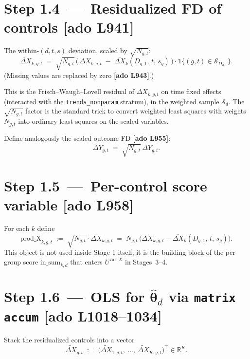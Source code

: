 \documentclass[11pt]{article}
\newcommand{\Adoref}[1]{\textcolor{accent}{\footnotesize\textbf{[ado L#1]}}}
\newcommand{\R}{\mathbb{R}}
\newcommand{\1}{\mathbb{1}}
\newcommand{\Smpl}{\mathcal{S}}
\newcommand{\thetad}{\widehat{\bm{\theta}}_d}
\newcommand{\Ngt}{N_{g,t}}
\newcommand{\dY}{\Delta Y_{g,t}}
\newcommand{\dXk}{\Delta X_{k,g,t}}
\newcommand{\dXbar}{\overline{\Delta X}}
\begin{document}
\section[Step 1.4 -- Residualized FD of controls (L941)]{Step 1.4 \,---\, Residualized FD of controls \Adoref{941}}

The within-$(d,t,s)$ deviation, scaled by $\sqrt{\Ngt}$:
\begin{equation}
\widetilde{\Delta X}_{k,g,t}
\;=\;
\sqrt{\Ngt}\,\bigl(\,\dXk \;-\; \dXbar_k(D_{g,1},\,t,\,s_g)\,\bigr)\cdot \1\{(g,t)\in\Smpl_{D_{g,1}}\}.
\label{eq:resid}
\end{equation}
(Missing values are replaced by zero \Adoref{943}.)

\medskip\noindent
This is the Frisch--Waugh--Lovell residual of $\dXk$ on time fixed effects
(interacted with the \texttt{trends\_nonparam} stratum), in the weighted
sample $\Smpl_d$. The $\sqrt{\Ngt}$ factor is the standard trick to convert
weighted least squares with weights $\Ngt$ into ordinary least squares on the
scaled variables.

\medskip\noindent
Define analogously the scaled outcome FD \Adoref{955}:
\begin{equation}
\widetilde{\Delta Y}_{g,t} \;=\; \sqrt{\Ngt}\,\dY .
\label{eq:residY}
\end{equation}

\section[Step 1.5 -- Per-control score variable (L958)]{Step 1.5 \,---\, Per-control score variable \Adoref{958}}

For each $k$ define
\begin{equation}
\mathrm{prod\_X}_{k,g,t} \;:=\; \sqrt{\Ngt}\cdot\widetilde{\Delta X}_{k,g,t}
\;=\; \Ngt\,\bigl(\dXk - \dXbar_k(D_{g,1},\,t,\,s_g)\bigr).
\label{eq:prodX}
\end{equation}
This object is not used inside Stage 1 itself; it is the building block of the
per-group score $\mathrm{in\_sum}_{k,d}$ that enters $U^{\mathrm{var},X}$ in
Stages~3--4.

\section[Step 1.6 -- OLS for theta_d via matrix accum (L1018--1034)]{Step 1.6 \,---\, OLS for $\thetad$ via \texttt{matrix accum} \Adoref{1018--1034}}

Stack the residualized controls into a vector
\[
\widetilde{\Delta X}_{g,t} \;:=\; \bigl(\widetilde{\Delta X}_{1,g,t},\ \dots,\ \widetilde{\Delta X}_{K,g,t}\bigr)^{\!\top}\in\R^{K}.
\]
\end{document}
